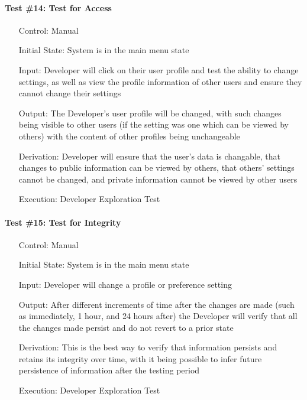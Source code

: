 \documentclass[12pt, titlepage]{article}
\begin{document}
\paragraph*{Test \#14: Test for Access}
\begin{itemize}
	\item[Control:] Manual
	\item[Initial State:] System is in the main menu state
	\item[Input:] Developer will click on their user profile and test the ability to change settings, as well as view the profile information of other users and ensure they cannot change their settings
	\item[Output:] The Developer's user profile will be changed, with such changes being visible to other users (if the setting was one which can be viewed by others) with the content of other profiles being unchangeable
	\item[Derivation:] Developer will ensure that the user's data is changable, that changes to public information can be viewed by others, that others' settings cannot be changed, and private information cannot be viewed by other users
	\item[Execution:] Developer Exploration Test
\end{itemize}

\paragraph*{Test \#15: Test for Integrity}

\begin{itemize}
	\item[Control:] Manual
	\item[Initial State:] System is in the main menu state
	\item[Input:] Developer will change a profile or preference setting
	\item[Output:] After different increments of time after the changes are made (such as immediately, 1 hour, and 24 hours after) the Developer will verify that all the changes made persist and do not revert to a prior state
	\item[Derivation:] This is the best way to verify that information persists and retains its integrity over time, with it being possible to infer future persistence of information after the testing period
	\item[Execution:] Developer Exploration Test
\end{itemize}
\end{document}
